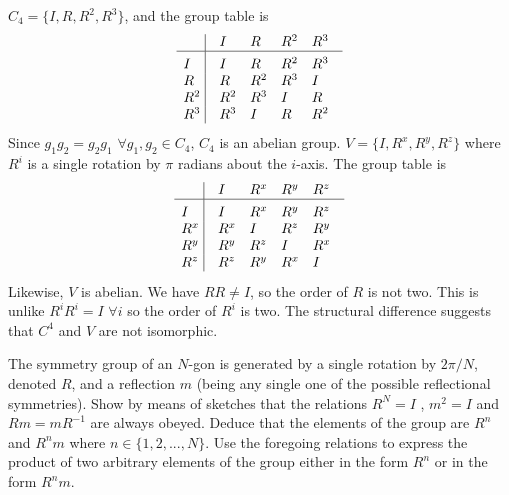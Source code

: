 \documentclass[a4paper]{article}
\begin{document}
\begin{ans}
$C_4=\{I,R,R^2,R^3\}$, and the group table is
$$\vbox{\tabskip0.5em\offinterlineskip
    \halign{\strut$#$\hfil\ \tabskip1em\vrule&&$#$\hfil\cr
    ~   & I   & R   & R^2 & R^3     \cr
    \noalign{\hrule}\vrule height 12pt width 0pt
    I   & I   & R  & R^2 & R^3      \cr
    R   & R   & R^2 & R^3   & I      \cr
    R^2 & R^2 & R^3   & I   & R      \cr
    R^3   & R^3   & I   & R   & R^2     \cr
}}$$
Since $g_1g_2=g_2g_1$ $\forall g_1,g_2\in C_4$, $C_4$ is an abelian group. $V=\{I,R^x,R^y,R^z\}$ where $R^i$ is a single rotation by $\pi$ radians about the $i$-axis. The group table is
$$\vbox{\tabskip0.5em\offinterlineskip
    \halign{\strut$#$\hfil\ \tabskip1em\vrule&&$#$\hfil\cr
    ~   & I   & R^x   & R^y & R^z     \cr
    \noalign{\hrule}\vrule height 12pt width 0pt
    I   & I   & R^x  & R^y & R^z      \cr
    R^x   & R^x   & I & R^z   & R^y      \cr
    R^y & R^y & R^z   & I   & R^x     \cr
    R^z   & R^z   & R^y   & R^x   & I     \cr
}}$$
Likewise, $V$ is abelian. We have $RR\neq I$, so the order of $R$ is not two. This is unlike $R^iR^i=I$ $\forall i$ so the order of $R^i$ is two. The structural difference suggests that $C^4$ and $V$ are not isomorphic.
\end{ans}
\begin{qns}
The symmetry group of an $N$-gon is generated by a single rotation by $2\pi/N$, denoted $R$, and a reflection $m$ (being any single one of the possible reflectional symmetries). Show by means of sketches that the relations $R^N=I$ , $m^2=I$ and $Rm=mR^{-1}$ are always obeyed. Deduce that the elements of the group are $R^n$ and $R^nm$ where $n\in\{1,2,...,N\}$. Use the foregoing relations to express the product of two arbitrary elements of the group either in
the form $R^n$ or in the form $R^nm$.
\end{qns}
\end{document}
